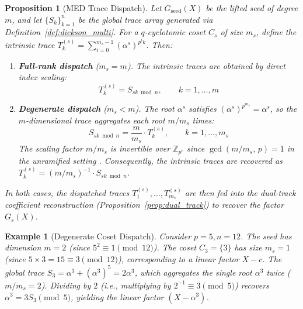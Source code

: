 \documentclass[12pt]{article}
\theoremstyle{plain}
\newtheorem{prop}[thm]{Proposition}
\newtheorem{example}{Example}
\begin{document}
\begin{prop}[MED Trace Dispatch] \label{prop:med_dispatch}
Let $G_{\text{seed}}(X)$ be the lifted seed of degree $m$, and let $\{S_k\}_{k=1}^{n}$ be the global trace array generated via Definition~\ref{def:dickson_multi}. For a $q$-cyclotomic coset $C_s$ of size $m_s$, define the intrinsic trace $T_k^{(s)} = \sum_{i=0}^{m_s-1} (\alpha^s)^{p^i k}$. Then:

\begin{enumerate}
    \item[\textup{(1)}] \textbf{Full-rank dispatch} ($m_s = m$). The intrinsic traces are obtained by direct index scaling:
    \begin{equation} \label{eq:trace_dispatch}
        T_k^{(s)} = S_{sk \bmod n}, \qquad k = 1, \dots, m
    \end{equation}
    
    \item[\textup{(2)}] \textbf{Degenerate dispatch} ($m_s < m$). The root $\alpha^s$ satisfies $(\alpha^s)^{p^{m_s}} = \alpha^s$, so the $m$-dimensional trace aggregates each root $m/m_s$ times:
    \begin{equation} \label{eq:degenerate_scaling}
        S_{sk \bmod n} = \frac{m}{m_s} \cdot T_k^{(s)}, \qquad k = 1, \dots, m_s
    \end{equation}
    The scaling factor $m/m_s$ is invertible over $\mathbb{Z}_{p^e}$ since $\gcd(m/m_s, \, p) = 1$ in the unramified setting \cite{Zhu_MED}. Consequently, the intrinsic traces are recovered as $T_k^{(s)} = (m/m_s)^{-1} \cdot S_{sk \bmod n}$.
\end{enumerate}
In both cases, the dispatched traces $T_1^{(s)}, \dots, T_{m_s}^{(s)}$ are then fed into the dual-track coefficient reconstruction (Proposition~\ref{prop:dual_track}) to recover the factor $G_s(X)$.
\end{prop}

\begin{example}[Degenerate Coset Dispatch]
Consider $p=5, n=12$. The seed has dimension $m=2$ (since $5^2 \equiv 1 \pmod{12}$). The coset $C_3 = \{3\}$ has size $m_s = 1$ (since $5 \times 3 = 15 \equiv 3 \pmod{12}$), corresponding to a linear factor $X - c$. The global trace $S_3 = \alpha^3 + (\alpha^3)^5 = 2\alpha^3$, which aggregates the single root $\alpha^3$ twice ($m/m_s = 2$). Dividing by $2$ (i.e., multiplying by $2^{-1} \equiv 3 \pmod{5}$) recovers $\alpha^3 = 3S_3 \pmod{5}$, yielding the linear factor $(X - \alpha^3)$.
\end{example}
\end{document}
